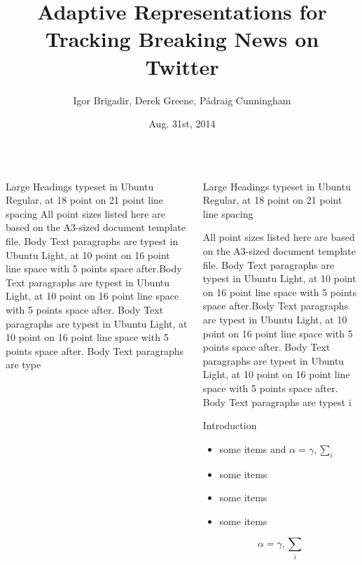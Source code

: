 \documentclass[final,hyperref={pdfpagelabels=false}]{beamer}
\title{Adaptive Representations for\\Tracking Breaking News on Twitter}
\author{Igor Brigadir, Derek Greene, P\'{a}draig Cunningham}
\institute[Insight]{Centre for\\Data Analytics}
\date{Aug. 31st, 2014}
\begin{document}
\begin{frame}{}

\begin{columns}[T]

\begin{column}{.43\paperwidth}

\begin{block}{Large Headings typeset in Ubuntu Regular, at 18 point on 21 point line spacing}
All point sizes listed here are based on the A3-sized document template file. Body Text paragraphs are typest in Ubuntu Light, at 10 point on 16 point line space with 5 points space after.Body Text paragraphs are typest in Ubuntu Light, at 10 point on 16 point line space with 5 points space after.
Body Text paragraphs are typest in Ubuntu 
Light, at 10 point on 16
 point line space with 5 points space after. Body Text paragraphs are type\end{block}
 
\end{column}

\begin{column}{.43\paperwidth}

\begin{block}{Large Headings typeset in Ubuntu Regular, at 18 point on 21 point line spacing}

All point sizes listed here are based on the A3-sized document template file. Body Text paragraphs are typest in Ubuntu Light, at 10 point on 16 point line space with 5 points space after.Body Text paragraphs are typest in Ubuntu Light, at 10 point on 16 point line space with 5 points space after. Body Text paragraphs are typest in Ubuntu Light, at 10 point on 16 point line space with 5 points space after. Body Text paragraphs are typest i
\end{block}

\begin{block}{Introduction}
	\begin{itemize}
		\item some items and $\alpha=\gamma, \sum_{i}$
		\item some items
		\item some items
		\item some items
	\end{itemize}
	
	$$\alpha=\gamma, \sum_{i}$$
	
\end{block}


\end{column}
\end{columns}
\end{frame}
\end{document}
